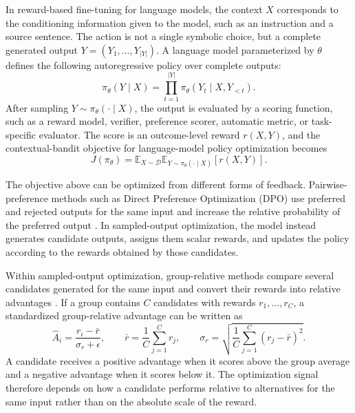 In reward-based fine-tuning for language models, the context \(X\) corresponds
to the conditioning information given to the model, such as an instruction and
a source sentence. The action is not a single symbolic choice, but a complete
generated output \(Y = (Y_1,\ldots,Y_{|Y|})\). A language model parameterized by
\(\theta\) defines the following autoregressive policy over complete outputs:
\begin{equation}
\pi_\theta(Y \mid X) =
\prod_{t=1}^{|Y|}
\pi_\theta(Y_t \mid X, Y_{<t}).
\end{equation}
After sampling \(Y \sim \pi_\theta(\cdot \mid X)\), the output is evaluated by
a scoring function, such as a reward model, verifier, preference scorer,
automatic metric, or task-specific evaluator. The score is an outcome-level
reward \(r(X,Y)\), and the contextual-bandit objective for language-model
policy optimization becomes
\begin{equation}
J(\pi_\theta) =
\mathbb{E}_{X \sim \mathcal{D}}
\mathbb{E}_{Y \sim \pi_\theta(\cdot \mid X)}
\left[r(X,Y)\right].
\end{equation}

The objective above can be optimized from different forms of feedback.
Pairwise-preference methods such as Direct Preference Optimization (DPO) use
preferred and rejected outputs for the same input and increase the relative
probability of the preferred output \citep{10.5555/3666122.3668460}. In
sampled-output optimization, the model instead generates candidate outputs,
assigns them scalar rewards, and updates the policy according to the rewards
obtained by those candidates.

Within sampled-output optimization, group-relative methods compare several
candidates generated for the same input and convert their rewards into relative
advantages \citep{Shao2024DeepSeekMathPT}. If a group contains \(C\) candidates
with rewards \(r_1,\ldots,r_C\), a standardized group-relative advantage can be
written as
\begin{equation}
\hat{A}_i = \frac{r_i - \bar{r}}{\sigma_r + \epsilon},
\qquad
\bar{r} = \frac{1}{C}\sum_{j=1}^{C} r_j,
\qquad
\sigma_r =
\sqrt{
\frac{1}{C}\sum_{j=1}^{C}(r_j-\bar{r})^2
}.
\end{equation}
A candidate receives a positive advantage when it scores above the group
average and a negative advantage when it scores below it. The optimization
signal therefore depends on how a candidate performs relative to alternatives
for the same input rather than on the absolute scale of the reward.

